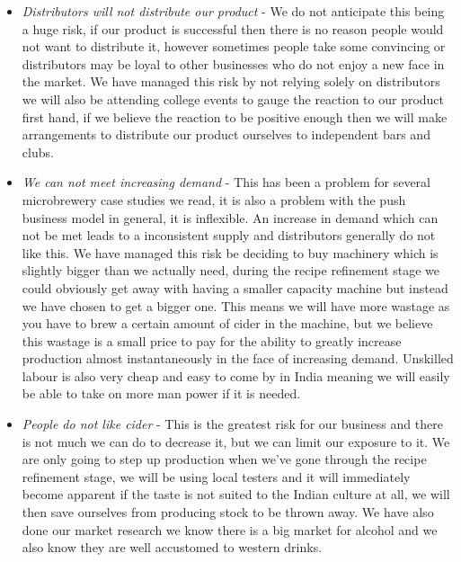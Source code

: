 \documentclass[11pt]{article}
\begin{document}
\begin{itemize}
\item \emph{Distributors will not distribute our product} - We do not 
anticipate this being a huge risk, if our product is successful then there is no
reason people would not want to distribute it, however sometimes people take 
some convincing or distributors may be loyal to other businesses who do not 
enjoy a new face in the market. We have managed this risk by not relying solely 
on distributors we will also be attending college events to gauge the reaction 
to our product first hand, if we believe the reaction to be positive enough then
we will make arrangements to distribute our product ourselves to independent 
bars and clubs. 
\item \emph{We can not meet increasing demand} - This has been a problem for 
several microbrewery case studies we read, it is also a problem with the push 
business model in general, it is inflexible. An increase in demand which can not 
be met leads to a inconsistent supply and distributors generally do not like 
this. We have managed this risk be deciding to buy machinery which is slightly 
bigger than we actually need, during the recipe refinement stage we could 
obviously get away with having a smaller capacity machine but instead we have 
chosen to get a bigger one. This means we will have more wastage as you have to
brew a certain amount of cider in the machine, but we believe this wastage is a small price to 
pay for the ability to greatly increase production almost instantaneously in the
 face of increasing demand. Unskilled labour 
is also very cheap and easy to come by in India meaning we will easily be able 
to take on more man power if it is needed. 
\item \emph{People do not like cider} - This is the greatest risk for our
business and there is not much we can do to decrease it, but we can
limit our exposure to it. We are only going to step up production when we've 
gone through the recipe refinement stage, we will be using local testers and it 
will immediately become apparent if the taste is not suited to the Indian 
culture at all, we will then save ourselves from producing stock to be thrown 
away. We have also done our market research we know there is a big market for 
alcohol and we also know they are well accustomed to western drinks.

\end{itemize}

\newpage

\end{document}
